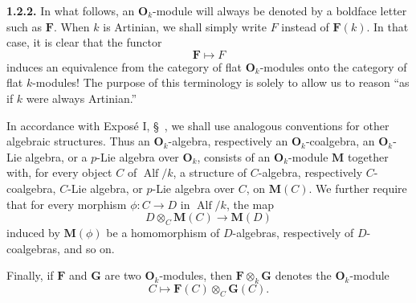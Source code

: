 \medskip
\noindent\textbf{1.2.2.}
\label{sga3:VIIB:1.2.2}
In what follows, an \(\mathbf O_k\)-module will always be denoted by a
boldface letter such as \(\mathbf F\). When \(k\) is Artinian, we shall
simply write \(F\) instead of \(\mathbf F(k)\). In that case, it is
clear that the functor
\[
  \mathbf F\longmapsto F
\]
induces an equivalence from the category of flat
\(\mathbf O_k\)-modules onto the category of flat \(k\)-modules! The
purpose of this terminology is solely to allow us to reason ``as if
\(k\) were always Artinian.''

In accordance with Expos\'e I, \S~, we shall use analogous
conventions for other algebraic structures. Thus an
\(\mathbf O_k\)-algebra, respectively an \(\mathbf O_k\)-coalgebra,
an \(\mathbf O_k\)-Lie algebra, or a \(p\)-Lie algebra over
\(\mathbf O_k\), consists of an \(\mathbf O_k\)-module \(\mathbf M\)
together with, for every object \(C\) of \(\operatorname{Alf}/k\), a
structure of \(C\)-algebra, respectively \(C\)-coalgebra, \(C\)-Lie
algebra, or \(p\)-Lie algebra over \(C\), on \(\mathbf M(C)\). We further require that
for every morphism \(\phi:C\to D\) in \(\operatorname{Alf}/k\), the
map
\[
  D\otimes_C\mathbf M(C)\longrightarrow\mathbf M(D)
\]
induced by \(\mathbf M(\phi)\) be a homomorphism of \(D\)-algebras,
respectively of \(D\)-coalgebras, and so on.

Finally, if \(\mathbf F\) and \(\mathbf G\) are two
\(\mathbf O_k\)-modules, then \(\mathbf F\otimes_k\mathbf G\) denotes
the \(\mathbf O_k\)-module
\[
  C\longmapsto\mathbf F(C)\otimes_C\mathbf G(C).
\]

